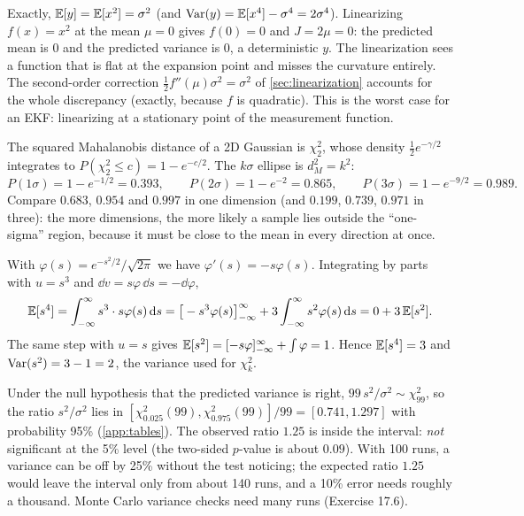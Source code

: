 \begin{solutions}
  \item Exactly, $\mathbb{E}[y] = \mathbb{E}[x^2] = \sigma^2$ (and $\operatorname{Var}(y) = \mathbb{E}[x^4] - \sigma^4 = 2\sigma^4$). Linearizing $f(x) = x^2$ at the mean $\mu = 0$ gives $f(0) = 0$ and $J = 2\mu = 0$:
        the predicted mean is $0$ and the predicted variance is $0$, a deterministic $y$. The linearization sees a function that is flat at the
        expansion point and misses the curvature entirely. The second-order correction $\tfrac12f''(\mu)\sigma^2 = \sigma^2$ of \cref{sec:linearization} accounts
        for the whole discrepancy (exactly, because $f$ is quadratic). This is the worst case for an EKF: linearizing at a stationary point of
        the measurement function.

  \item The squared Mahalanobis distance of a 2D Gaussian is $\chi^2_2$, whose density $\tfrac12e^{-\gamma/2}$ integrates to $P(\chi^2_2 \le c) = 1 - e^{-c/2}$.
        The $k\sigma$ ellipse is $d_M^2 = k^2$:
        \[
          P(1\sigma) = 1 - e^{-1/2} = 0.393, \qquad P(2\sigma) = 1 - e^{-2} = 0.865, \qquad P(3\sigma) = 1 - e^{-9/2} = 0.989 .
        \]
        Compare $0.683$, $0.954$ and $0.997$ in one dimension (and $0.199$, $0.739$, $0.971$ in three): the more dimensions, the more likely a sample lies outside
        the ``one-sigma'' region, because it must be close to the mean in every direction at once.

  \item With $\varphi(s) = e^{-s^2/2}/\sqrt{2\pi}$ we have $\varphi'(s) = -s\varphi(s)$. Integrating by parts with $u = s^3$ and $\dd v = s\varphi\,\dd s = -\dd\varphi$,
        \[
          \mathbb{E}[s^4] = \int_{-\infty}^{\infty}s^3\cdot s\varphi(s)\,\mathrm{d} s = \big[-s^3\varphi(s)\big]_{-\infty}^{\infty} + 3\int_{-\infty}^{\infty}s^2\varphi(s)\,\mathrm{d} s = 0 + 3\,\mathbb{E}[s^2] .
        \]
        The same step with $u = s$ gives $\mathbb{E}[s^2] = [-s\varphi]_{-\infty}^{\infty} + \int\varphi = 1$. Hence $\mathbb{E}[s^4] = 3$ and $\operatorname{Var}(s^2) = 3 - 1 = 2$, the variance used for $\chi^2_k$.

  \item Under the null hypothesis that the predicted variance is right, $99\,s^2/\sigma^2 \sim \chi^2_{99}$, so the ratio $s^2/\sigma^2$ lies in
        $[\chi^2_{0.025}(99), \chi^2_{0.975}(99)]/99 = [0.741, 1.297]$ with probability 95\% (\cref{app:tables}). The observed ratio $1.25$ is inside the
        interval: \emph{not} significant at the 5\% level (the two-sided $p$-value is about $0.09$). With 100 runs, a variance can be off by 25\%
        without the test noticing; the expected ratio $1.25$ would leave the interval only from about 140 runs, and a 10\% error needs
        roughly a thousand. Monte Carlo variance checks need many runs (Exercise 17.6).
\end{solutions}
